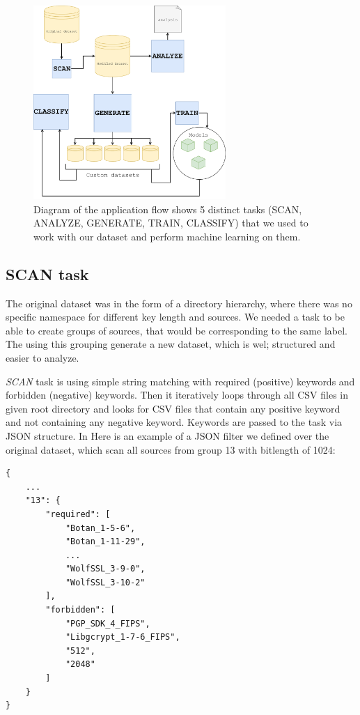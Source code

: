 \begin{figure}[H]
\centering
\includegraphics[width=0.65\textwidth]{tex/images/thesis_model}
\caption{Diagram of the application flow shows 5 distinct tasks (SCAN, ANALYZE, GENERATE, TRAIN, CLASSIFY) that we used to work with our dataset and perform machine learning on them.}
\label{figure-model}
\end{figure}

\subsection{SCAN task}

The original dataset was in the form of a directory hierarchy, where there was no specific namespace for different key length and sources. We needed a task to be able to create groups of sources, that would be corresponding to the same label. The using this grouping generate a new dataset, which is wel; structured and easier to analyze.

\textit{SCAN} task is using simple string matching with required (positive) keywords and forbidden (negative) keywords. Then it iteratively loops through all CSV files in given root directory and looks for CSV files that contain any positive keyword and not containing any negative keyword. Keywords are passed to the task via JSON structure. In Here is an example of a JSON filter we defined over the original dataset, which scan all sources from group 13 with bitlength of 1024: 

\begin{verbatim}
{
    ...
    "13": {
        "required": [
            "Botan_1-5-6",
            "Botan_1-11-29",
            ...
            "WolfSSL_3-9-0",
            "WolfSSL_3-10-2"
        ],
        "forbidden": [
            "PGP_SDK_4_FIPS",
            "Libgcrypt_1-7-6_FIPS",
            "512",
            "2048"
        ]
    }
}

\end{verbatim}

